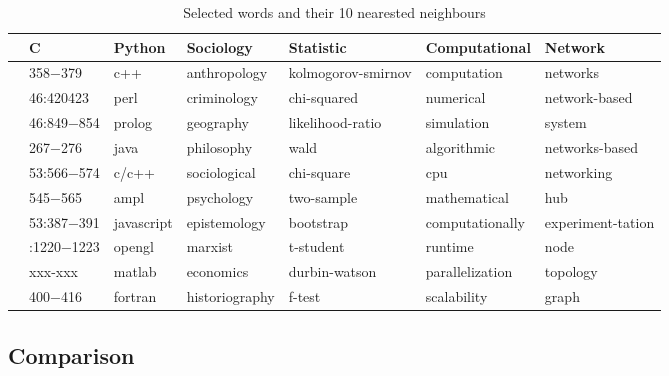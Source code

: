 \documentclass[12pt, a4paper]{article}
\begin{document}
\begin{table}[h]
	\centering
	\begin{adjustbox}{center}
		\begin{tabular}{lllllll}
			\toprule
			{} &           C &      Python &       Sociology &           Statistic &   Computational &            Network \\
			\midrule
			&    \num{358}\num{-379} &         c++ &    anthropology &  kolmogorov-smirnov &      computation &           networks \\
			&  \num{46}:420423 &        perl &     criminology &         chi-squared &        numerical &      network-based \\
			& \num{46}:849\num{-854} &      prolog &       geography &    likelihood-ratio &       simulation &             system \\
			&    \num{267}\num{-276} &        java &      philosophy &                wald &      algorithmic &     networks-based \\
			& \num{53}:566\num{-574} &       c/c++ &    sociological &          chi-square &              cpu &         networking \\
			&    \num{545}\num{-565} &        ampl &      psychology &          two-sample &     mathematical &                hub \\
			& \num{53}:387\num{-391} &  javascript &    epistemology &           bootstrap &  computationally &  experiment-tation \\
			&  :1220\num{-1223} &      opengl &         marxist &           t-student &          runtime &               node \\
			&     xxx-xxx &      matlab &       economics &       durbin-watson &  parallelization &           topology \\
			&    \num{400}\num{-416} &     fortran &  historiography &              f-test &      scalability &              graph \\
			\bottomrule
		\end{tabular}
	\end{adjustbox}
	\caption{Selected words and their 10 nearested neighbours}\label{nearests}
\end{table}

\subsection{Comparison}
\end{document}
